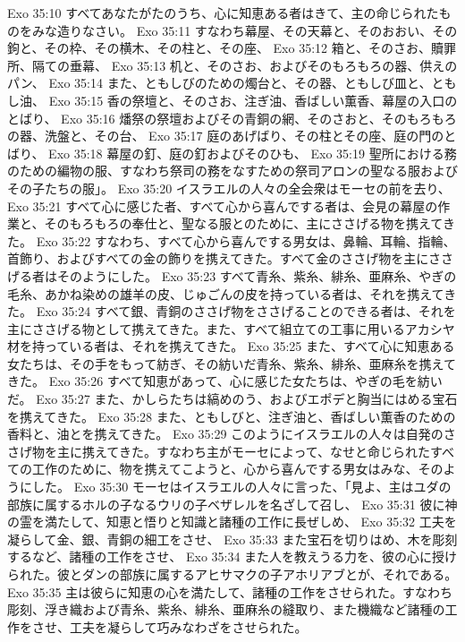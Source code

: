 Exo 35:10  すべてあなたがたのうち、心に知恵ある者はきて、主の命じられたものをみな造りなさい。
Exo 35:11  すなわち幕屋、その天幕と、そのおおい、その鉤と、その枠、その横木、その柱と、その座、
Exo 35:12  箱と、そのさお、贖罪所、隔ての垂幕、
Exo 35:13  机と、そのさお、およびそのもろもろの器、供えのパン、
Exo 35:14  また、ともしびのための燭台と、その器、ともしび皿と、ともし油、
Exo 35:15  香の祭壇と、そのさお、注ぎ油、香ばしい薫香、幕屋の入口のとばり、
Exo 35:16  燔祭の祭壇およびその青銅の網、そのさおと、そのもろもろの器、洗盤と、その台、
Exo 35:17  庭のあげばり、その柱とその座、庭の門のとばり、
Exo 35:18  幕屋の釘、庭の釘およびそのひも、
Exo 35:19  聖所における務のための編物の服、すなわち祭司の務をなすための祭司アロンの聖なる服およびその子たちの服」。
Exo 35:20  イスラエルの人々の全会衆はモーセの前を去り、
Exo 35:21  すべて心に感じた者、すべて心から喜んでする者は、会見の幕屋の作業と、そのもろもろの奉仕と、聖なる服とのために、主にささげる物を携えてきた。
Exo 35:22  すなわち、すべて心から喜んでする男女は、鼻輪、耳輪、指輪、首飾り、およびすべての金の飾りを携えてきた。すべて金のささげ物を主にささげる者はそのようにした。
Exo 35:23  すべて青糸、紫糸、緋糸、亜麻糸、やぎの毛糸、あかね染めの雄羊の皮、じゅごんの皮を持っている者は、それを携えてきた。
Exo 35:24  すべて銀、青銅のささげ物をささげることのできる者は、それを主にささげる物として携えてきた。また、すべて組立ての工事に用いるアカシヤ材を持っている者は、それを携えてきた。
Exo 35:25  また、すべて心に知恵ある女たちは、その手をもって紡ぎ、その紡いだ青糸、紫糸、緋糸、亜麻糸を携えてきた。
Exo 35:26  すべて知恵があって、心に感じた女たちは、やぎの毛を紡いだ。
Exo 35:27  また、かしらたちは縞めのう、およびエポデと胸当にはめる宝石を携えてきた。
Exo 35:28  また、ともしびと、注ぎ油と、香ばしい薫香のための香料と、油とを携えてきた。
Exo 35:29  このようにイスラエルの人々は自発のささげ物を主に携えてきた。すなわち主がモーセによって、なせと命じられたすべての工作のために、物を携えてこようと、心から喜んでする男女はみな、そのようにした。
Exo 35:30  モーセはイスラエルの人々に言った、「見よ、主はユダの部族に属するホルの子なるウリの子ベザレルを名ざして召し、
Exo 35:31  彼に神の霊を満たして、知恵と悟りと知識と諸種の工作に長ぜしめ、
Exo 35:32  工夫を凝らして金、銀、青銅の細工をさせ、
Exo 35:33  また宝石を切りはめ、木を彫刻するなど、諸種の工作をさせ、
Exo 35:34  また人を教えうる力を、彼の心に授けられた。彼とダンの部族に属するアヒサマクの子アホリアブとが、それである。
Exo 35:35  主は彼らに知恵の心を満たして、諸種の工作をさせられた。すなわち彫刻、浮き織および青糸、紫糸、緋糸、亜麻糸の縫取り、また機織など諸種の工作をさせ、工夫を凝らして巧みなわざをさせられた。
